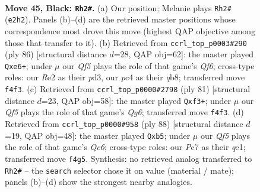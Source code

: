 \documentclass[11pt]{article}
\begin{document}
\clearpage

\begin{figure}[p]\centering
\begin{subfigure}{0.46\textwidth}\centering
\resizebox{\linewidth}{!}{%
\newchessgame
\chessboard[
  setfen={6k1/2p2p2/8/6P1/2P1Pq2/7K/4r3/8 b - - 3 45},
  showmover=false,
  pgfstyle=straightmove, color=movearrow, markmove={e2-h2}
]}
\caption{}
\end{subfigure}\hfill
\begin{subfigure}{0.46\textwidth}\centering
\resizebox{\linewidth}{!}{%
\newchessgame
\chessboard[
  setfen={1q4k1/8/4pQ1p/6pP/1P6/3p4/5PK1/8 w - - 2 44},
  showmover=false,
  pgfstyle=straightmove, color=movearrow, markmove={f6-e6}
]}
\caption{}
\end{subfigure}
\\[4pt]
\begin{subfigure}{0.46\textwidth}\centering
\resizebox{\linewidth}{!}{%
\newchessgame
\chessboard[
  setfen={8/Q7/p7/6p1/8/P1P2PqP/8/k6K b - - 0 41},
  showmover=false,
  pgfstyle=straightmove, color=movearrow, markmove={g3-f3}
]}
\caption{}
\end{subfigure}\hfill
\begin{subfigure}{0.46\textwidth}\centering
\resizebox{\linewidth}{!}{%
\newchessgame
\chessboard[
  setfen={8/4k3/2Q5/1p1p4/8/8/2P3PK/4q3 w - - 5 45},
  showmover=false,
  pgfstyle=straightmove, color=movearrow, markmove={c6-b5}
]}
\caption{}
\end{subfigure}
\caption{\textbf{Move 45, Black: \texttt{Rh2\#}.} (a) Our position; Melanie plays \texttt{Rh2\#} (\texttt{e2h2}). Panels (b)--(d) are the retrieved master positions whose correspondence most drove this move (highest QAP objective among those that transfer to it). (b) Retrieved from \texttt{ccrl\_top\_p0003\#290} (ply 86) [structural distance $d$=28, QAP obj=62]: the master played \texttt{Qxe6+}; under $\mu$ our \emph{Qf5} plays the role of that game's \emph{Qf6}; cross-type roles: our \emph{R}e2 as their \emph{p}d3, our \emph{p}c4 as their \emph{q}b8; transferred move \texttt{f4f3}. (c) Retrieved from \texttt{ccrl\_top\_p0000\#2798} (ply 81) [structural distance $d$=23, QAP obj=58]: the master played \texttt{Qxf3+}; under $\mu$ our \emph{Qf5} plays the role of that game's \emph{Qg6}; transferred move \texttt{f4f3}. (d) Retrieved from \texttt{ccrl\_top\_p0000\#958} (ply 88) [structural distance $d$=19, QAP obj=48]: the master played \texttt{Qxb5}; under $\mu$ our \emph{Qf5} plays the role of that game's \emph{Qc6}; cross-type roles: our \emph{P}c7 as their \emph{q}e1; transferred move \texttt{f4g5}. Synthesis: no retrieved analog transferred to \texttt{Rh2\#} -- the \texttt{search} selector chose it on value (material / mate); panels (b)--(d) show the strongest nearby analogies.}
\label{fig:thought-m89}
\end{figure}
\end{document}
